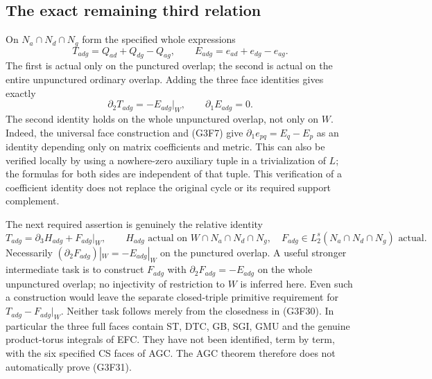 \subsection{The exact remaining third relation}

On $N_a\cap N_d\cap N_g$ form the specified whole expressions
\[
 T_{adg}=Q_{ad}+Q_{dg}-Q_{ag},\qquad
 E_{adg}=e_{ad}+e_{dg}-e_{ag}.
 \tag{G3F29}
\]
The first is actual only on the punctured overlap; the second is
actual on the entire unpunctured ordinary overlap.  Adding the three
face identities gives exactly
\[
             \partial_2T_{adg}=-E_{adg}|_W,
                          \qquad \partial_1E_{adg}=0.
 \tag{G3F30}
\]
The second identity holds on the whole unpunctured overlap, not
only on $W$.  Indeed, the universal face construction and (G3F7)
give $\partial_1e_{pq}=E_q-E_p$ as an identity depending only on
matrix coefficients and metric.  This can also be verified locally
by using a nowhere-zero auxiliary tuple in a trivialization of $L$;
the formulas for both sides are independent of that tuple.  This
verification of a coefficient identity does not replace the original
cycle or its required support complement.

The next required assertion is genuinely the relative identity
\[
 T_{adg}=\partial_3 H_{adg}+F_{adg}|_W,
 \qquad H_{adg}\text{ actual on }W\cap N_a\cap N_d\cap N_g,
 \quad F_{adg}\in L_2^s(N_a\cap N_d\cap N_g)\text{ actual}.
 \tag{G3F31}
\]
Necessarily $(\partial_2F_{adg})|_W=-E_{adg}|_W$ on the
punctured overlap.  A useful stronger intermediate task is to
construct $F_{adg}$ with $\partial_2F_{adg}=-E_{adg}$ on the
whole unpunctured overlap; no injectivity of restriction to $W$
is inferred here.  Even such a construction would leave the
separate closed-triple primitive requirement for
$T_{adg}-F_{adg}|_W$.  Neither task follows merely from
the closedness in (G3F30).  In particular the three full faces
contain ST, DTC, GB, SGI, GMU and the genuine product-torus
integrals of EFC.  They have not been identified, term by term,
with the six specified CS faces of AGC.  The AGC theorem therefore
does not automatically prove (G3F31).

